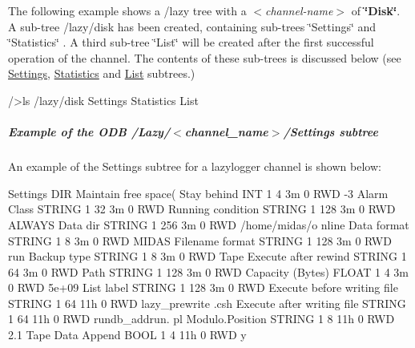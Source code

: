 The following example shows a /lazy tree with a {\itshape  $<$channel-\/name$>$ \/} of {\bfseries \char`\"{}Disk\char`\"{}}. A sub-\/tree /lazy/disk has been created, containing sub-\/trees \char`\"{}Settings\char`\"{} and \char`\"{}Statistics\char`\"{} . A third sub-\/tree \char`\"{}List\char`\"{} will be created after the first successful operation of the channel. The contents of these sub-\/trees is discussed below (see \hyperlink{F_LogUtil_F_ODB_Lazy_Settings}{Settings}, \hyperlink{F_LogUtil_F_ODB_Lazy_Statistics}{Statistics} and \hyperlink{F_LogUtil_F_ODB_Lazy_List}{List} subtrees.) 
\begin{DoxyCode}
/>ls /lazy/disk
Settings
Statistics
List
\end{DoxyCode}


\par


\par
 \hypertarget{F_LogUtil_F_ODB_Lazy_Settings_example}{}\subparagraph{Example of the  ODB /Lazy/$<$channel\_\-name$>$/Settings subtree}\label{F_LogUtil_F_ODB_Lazy_Settings_example}
An example of the Settings subtree for a lazylogger channel is shown below:


\begin{DoxyCode}
    Settings                      DIR
        Maintain free space(%
        Stay behind               INT     1     4     3m   0   RWD  -3
        Alarm Class               STRING  1     32    3m   0   RWD  
        Running condition         STRING  1     128   3m   0   RWD  ALWAYS
        Data dir                  STRING  1     256   3m   0   RWD  /home/midas/o
      nline
        Data format               STRING  1     8     3m   0   RWD  MIDAS
        Filename format           STRING  1     128   3m   0   RWD  run%
        Backup type               STRING  1     8     3m   0   RWD  Tape
        Execute after rewind      STRING  1     64    3m   0   RWD  
        Path                      STRING  1     128   3m   0   RWD  
        Capacity (Bytes)          FLOAT   1     4     3m   0   RWD  5e+09
        List label                STRING  1     128   3m   0   RWD  
  Execute before writing file     STRING  1     64    11h  0   RWD  lazy_prewrite
      .csh
  Execute after writing file      STRING  1     64    11h  0   RWD  rundb_addrun.
      pl
  Modulo.Position                 STRING  1     8     11h  0   RWD  2.1
  Tape Data Append                BOOL    1     4     11h  0   RWD  y
\end{DoxyCode}


